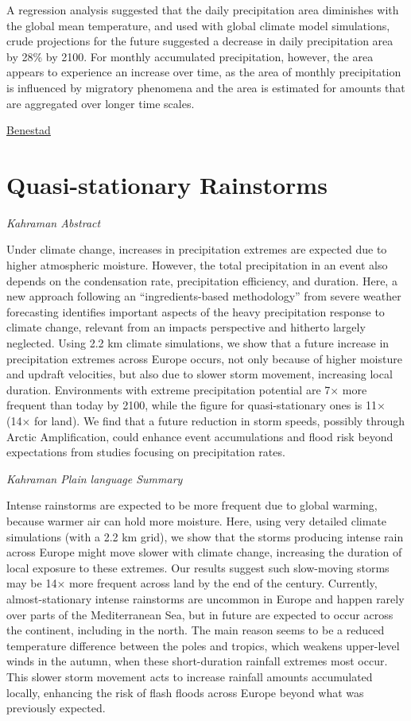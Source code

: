 \documentclass[
]{book}
\begin{document}
A regression analysis suggested that the daily precipitation area diminishes with the global mean temperature, and used with global climate model simulations, crude projections for the future suggested a decrease in daily precipitation area by 28\% by 2100. For monthly accumulated precipitation, however, the area appears to experience an increase over time, as the area of monthly precipitation is influenced by migratory phenomena and the area is estimated for amounts that are aggregated over longer time scales.

\href{https://iopscience.iop.org/article/10.1088/1748-9326/aab375}{Benestad}

\hypertarget{quasi-stationary-rainstorms}{%
\section{Quasi-stationary Rainstorms}\label{quasi-stationary-rainstorms}}

\emph{Kahraman Abstract}

Under climate change, increases in precipitation extremes are expected due to higher atmospheric moisture. However, the total precipitation in an event also depends on the condensation rate, precipitation efficiency, and duration. Here, a new approach following an ``ingredients-based methodology'' from severe weather forecasting identifies important aspects of the heavy precipitation response to climate change, relevant from an impacts perspective and hitherto largely neglected. Using 2.2 km climate simulations, we show that a future increase in precipitation extremes across Europe occurs, not only because of higher moisture and updraft velocities, but also due to slower storm movement, increasing local duration. Environments with extreme precipitation potential are 7× more frequent than today by 2100, while the figure for quasi-stationary ones is 11× (14× for land). We find that a future reduction in storm speeds, possibly through Arctic Amplification, could enhance event accumulations and flood risk beyond expectations from studies focusing on precipitation rates.

\emph{Kahraman Plain language Summary}

Intense rainstorms are expected to be more frequent due to global warming, because warmer air can hold more moisture. Here, using very detailed climate simulations (with a 2.2 km grid), we show that the storms producing intense rain across Europe might move slower with climate change, increasing the duration of local exposure to these extremes. Our results suggest such slow-moving storms may be 14× more frequent across land by the end of the century. Currently, almost-stationary intense rainstorms are uncommon in Europe and happen rarely over parts of the Mediterranean Sea, but in future are expected to occur across the continent, including in the north. The main reason seems to be a reduced temperature difference between the poles and tropics, which weakens upper-level winds in the autumn, when these short-duration rainfall extremes most occur. This slower storm movement acts to increase rainfall amounts accumulated locally, enhancing the risk of flash floods across Europe beyond what was previously expected.
\end{document}
